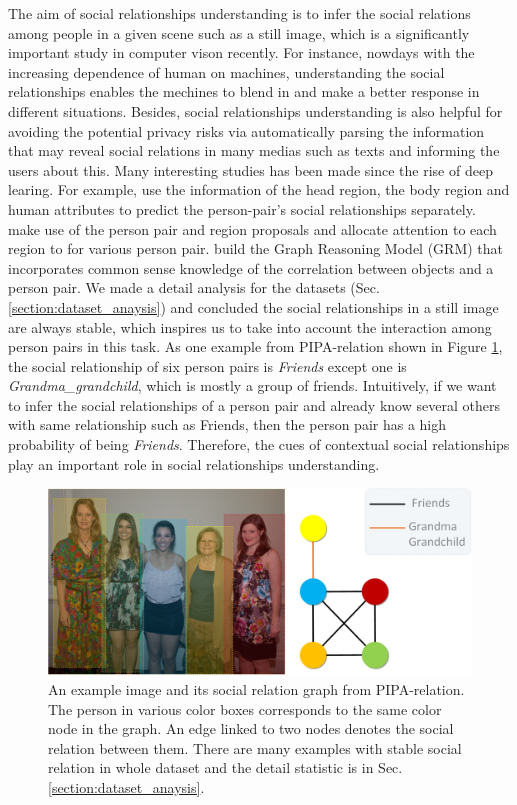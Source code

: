 \documentclass{article}
\begin{document}
The aim of social relationships understanding is to infer the social relations among people in a given scene such as a still image, which is a significantly important study in computer vison recently. For instance, nowdays with the increasing dependence of human on machines, understanding the social relationships enables the mechines to blend in and make a better response in different situations. Besides, social relationships understanding is also helpful for avoiding the potential privacy risks via automatically parsing the information that may reveal social relations in many medias such as texts \cite{article} and informing the users about this. Many interesting studies has been made since the rise of deep learing. For example, \cite{DBLP:conf/cvpr/SunSF17} use the information of the head region, the body region and human attributes to predict the person-pair's social relationships separately. \cite{DBLP:conf/iccv/LiWZK17} make use of the person pair and region proposals and allocate attention to each region to for various person pair. \cite{DBLP:conf/ijcai/WangCRYCL18} build the Graph Reasoning Model (GRM) that incorporates common sense knowledge of the correlation between objects and a person pair. We made a detail analysis for the datasets (Sec. \ref{section:dataset_anaysis}) and concluded the social relationships in a still image are always stable, which inspires us to take into account the interaction among person pairs in this task. As one example from PIPA-relation \cite{DBLP:conf/cvpr/SunSF17} shown in Figure \ref{fig:example}, the social relationship of six person pairs is {\it Friends} except one is {\it Grandma\_grandchild}, which is mostly a group of friends. Intuitively, if we want to infer the social relationships of a person pair and already know several others with same relationship such as Friends, then the person pair has a high probability of being {\it Friends}. Therefore, the cues of contextual social relationships play an important role in social relationships understanding.

\vspace*{-1mm}
\begin{figure}[htpb]
	\centering
	\includegraphics[width=0.48 \textwidth,clip]{./pic/example.png}
 \caption{An example image and its social relation graph from PIPA-relation. The person in various color boxes corresponds to the same color node in the graph. An edge linked to two nodes denotes the social relation between them. There are many examples with stable social relation in whole dataset and the detail statistic is in Sec. \ref{section:dataset_anaysis}.}
	\vspace*{-3.5mm}
	\label{fig:example}
\end{figure}
\end{document}
